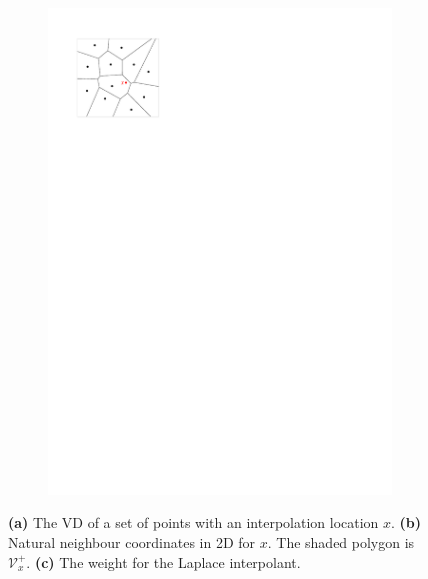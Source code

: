 \begin{figure}
\begin{subfigure}[b]{0.3\linewidth}
    \includegraphics[width=\textwidth,page=3]{figs/laplace.pdf}
    \caption{}\label{fig:laplace}
  \end{subfigure}%
\caption{\textbf{(a)} The VD of a set of points with an interpolation location $x$. \textbf{(b)} Natural neighbour coordinates in 2D for $x$. The shaded polygon is $\mathcal{V}^{+}_{x}$. \textbf{(c)} The weight for the Laplace interpolant.}
\label{fig:nn}
\end{figure}

